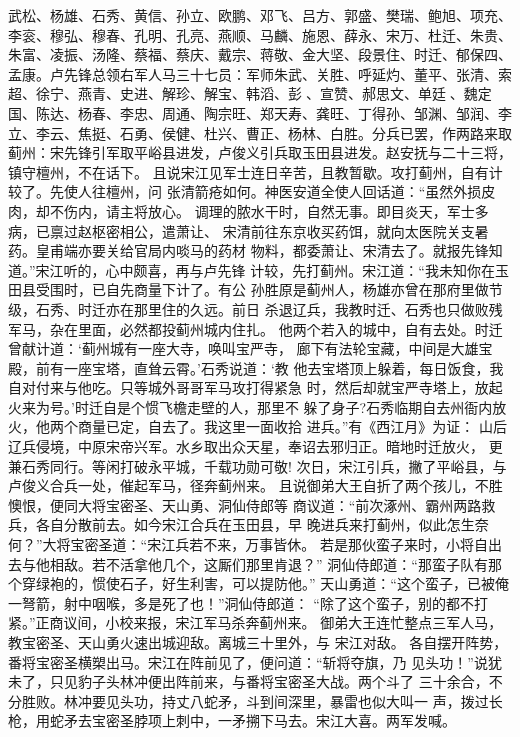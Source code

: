 武松、杨雄、石秀、黄信、孙立、欧鹏、邓飞、吕方、郭盛、樊瑞、鲍旭、项充、
李衮、穆弘、穆春、孔明、孔亮、燕顺、马麟、施恩、薛永、宋万、杜迁、朱贵、
朱富、凌振、汤隆、蔡福、蔡庆、戴宗、蒋敬、金大坚、段景住、时迁、郁保四、
孟康。卢先锋总领右军人马三十七员：军师朱武、关胜、呼延灼、董平、张清、索
超、徐宁、燕青、史进、解珍、解宝、韩滔、彭、宣赞、郝思文、单廷、魏定
国、陈达、杨春、李忠、周通、陶宗旺、郑天寿、龚旺、丁得孙、邹渊、邹润、李
立、李云、焦挺、石勇、侯健、杜兴、曹正、杨林、白胜。分兵已罢，作两路来取
蓟州：宋先锋引军取平峪县进发，卢俊义引兵取玉田县进发。赵安抚与二十三将，
镇守檀州，不在话下。
且说宋江见军士连日辛苦，且教暂歇。攻打蓟州，自有计较了。先使人往檀州，问
张清箭疮如何。神医安道全使人回话道：“虽然外损皮肉，却不伤内，请主将放心。
调理的脓水干时，自然无事。即目炎天，军士多病，已禀过赵枢密相公，遣萧让、
宋清前往东京收买药饵，就向太医院关支暑药。皇甫端亦要关给官局内啖马的药材
物料，都委萧让、宋清去了。就报先锋知道。”宋江听的，心中颇喜，再与卢先锋
计较，先打蓟州。宋江道：“我未知你在玉田县受围时，已自先商量下计了。有公
孙胜原是蓟州人，杨雄亦曾在那府里做节级，石秀、时迁亦在那里住的久远。前日
杀退辽兵，我教时迁、石秀也只做败残军马，杂在里面，必然都投蓟州城内住扎。
他两个若入的城中，自有去处。时迁曾献计道：‘蓟州城有一座大寺，唤叫宝严寺，
廊下有法轮宝藏，中间是大雄宝殿，前有一座宝塔，直耸云霄。’石秀说道：‘教
他去宝塔顶上躲着，每日饭食，我自对付来与他吃。只等城外哥哥军马攻打得紧急
时，然后却就宝严寺塔上，放起火来为号。’时迁自是个惯飞檐走壁的人，那里不
躲了身子?石秀临期自去州衙内放火，他两个商量已定，自去了。我这里一面收拾
进兵。”有《西江月》为证：
山后辽兵侵境，中原宋帝兴军。水乡取出众天星，奉诏去邪归正。暗地时迁放火，
更兼石秀同行。等闲打破永平城，千载功勋可敬!
次日，宋江引兵，撇了平峪县，与卢俊义合兵一处，催起军马，径奔蓟州来。
且说御弟大王自折了两个孩儿，不胜懊恨，便同大将宝密圣、天山勇、洞仙侍郎等
商议道：“前次涿州、霸州两路救兵，各自分散前去。如今宋江合兵在玉田县，早
晚进兵来打蓟州，似此怎生奈何？”大将宝密圣道：“宋江兵若不来，万事皆休。
若是那伙蛮子来时，小将自出去与他相敌。若不活拿他几个，这厮们那里肯退？”
洞仙侍郎道：“那蛮子队有那个穿绿袍的，惯使石子，好生利害，可以提防他。”
天山勇道：“这个蛮子，已被俺一弩箭，射中咽喉，多是死了也！”洞仙侍郎道：
“除了这个蛮子，别的都不打紧。”正商议间，小校来报，宋江军马杀奔蓟州来。
御弟大王连忙整点三军人马，教宝密圣、天山勇火速出城迎敌。离城三十里外，与
宋江对敌。
各自摆开阵势，番将宝密圣横槊出马。宋江在阵前见了，便问道：“斩将夺旗，乃
见头功！”说犹未了，只见豹子头林冲便出阵前来，与番将宝密圣大战。两个斗了
三十余合，不分胜败。林冲要见头功，持丈八蛇矛，斗到间深里，暴雷也似大叫一
声，拨过长枪，用蛇矛去宝密圣脖项上刺中，一矛搠下马去。宋江大喜。两军发喊。
